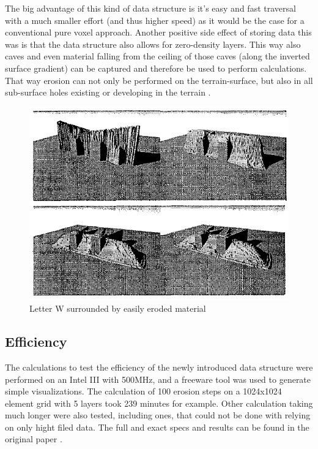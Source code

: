 The big advantage of this kind of data structure is it's easy and fast traversal with a much smaller effort (and thus higher speed) as it would be the case for a conventional pure voxel approach. Another positive side effect of storing data this was is that the data structure also allows for zero-density layers. This way also caves and even material falling from the ceiling of those caves (along the inverted surface gradient) can be captured and therefore be used to perform calculations. That way erosion can not only be performed on the terrain-surface, but also in all sub-surface holes existing or developing in the terrain \cite{marechal2010heat}.

\begin{figure}[htb]
	\centering
	\includegraphics[width=\linewidth]{MGG_10/8582.png}
	\caption{Letter W surrounded by easily eroded material}
	\label{fig:erosiondifference}
\end{figure}

\subsection{Efficiency}
The calculations to test the efficiency of the newly introduced data structure were performed on an Intel III with 500MHz, and a freeware tool was used to generate simple visualizations. The calculation of 100 erosion steps on a 1024x1024 element grid with 5 layers took 239 minutes for example. Other calculation taking much longer were also tested, including ones, that could not be done with relying on only hight filed data. The full and exact specs and results can be found in the original paper \cite{marechal2010heat}.